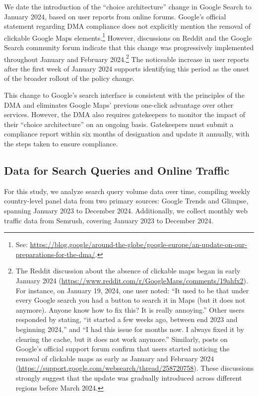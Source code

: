\documentclass[11pt]{article}
\begin{document}
	We date the introduction of the ``choice architecture'' change in Google Search to January 2024, based on user reports from online forums. Google's official statement regarding DMA compliance does not explicitly mention the removal of clickable Google Maps elements.\footnote{See: \href{https://blog.google/around-the-globe/google-europe/an-update-on-our-preparations-for-the-dma/}{https://blog.google/around-the-globe/google-europe/an-update-on-our-preparations-for-the-dma/}.} However, discussions on Reddit and the Google Search community forum indicate that this change was progressively implemented throughout January and February 2024.\footnote{The Reddit discussion about the absence of clickable maps began in early January 2024 (\href{https://www.reddit.com/r/GoogleMaps/comments/19ahfx2/why_doesnt_maps_show_up_under_google_searches/?rdt=48192}{https://www.reddit.com/r/GoogleMaps/comments/19ahfx2}). For instance, on January 19, 2024, one user noted: ``It used to be that under every Google search you had a button to search it in Maps (but it does not anymore). Anyone know how to fix this? It is really annoying.'' Other users responded by stating, ``it started a few weeks ago, between end 2023 and beginning 2024,'' and ``I had this issue for months now. I always fixed it by clearing the cache, but it does not work anymore.'' Similarly, posts on Google's official support forum confirm that users started noticing the removal of clickable maps as early as January and February 2024 (\href{https://support.google.com/websearch/thread/258720758}{https://support.google.com/websearch/thread/258720758}). These discussions strongly suggest that the update was gradually introduced across different regions before March 2024.} The noticeable increase in user reports after the first week of January 2024 supports identifying this period as the onset of the broader rollout of the policy change.
	
	This change to Google's search interface is consistent with the principles of the DMA and eliminates Google Maps' previous one-click advantage over other services. However, the DMA also requires gatekeepers to monitor the impact of their ``choice architecture'' on an ongoing basis. Gatekeepers must submit a compliance report within six months of designation and update it annually, with the steps taken to ensure compliance.
	
	
	
	\subsection{Data for Search Queries and Online Traffic} \label{subsec:data}
	For this study, we analyze search query volume data over time, compiling weekly country-level panel data from two primary sources: Google Trends and Glimpse, spanning January 2023 to December 2024. Additionally, we collect monthly web traffic data from Semrush, covering January 2023 to December 2024.
	
\end{document}
